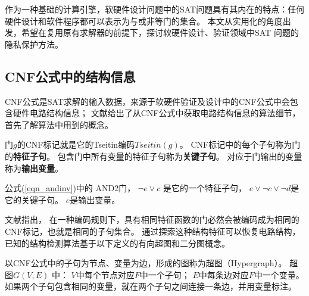 作为一种基础的计算引擎，软硬件设计问题中的SAT问题具有其内在的特点：任何硬件设计和软件程序都可以表示为与或非等门的集合。
本文从实用化的角度出发，希望在复用原有求解器的前提下，探讨软硬件设计、验证领域中SAT 问题的隐私保护方法。

\subsection{CNF公式中的结构信息}\label{CNF structure}
CNF公式是SAT求解的输入数据，来源于软硬件验证及设计中的CNF公式中会包含硬件电路结构信息；
文献给出了从CNF公式中获取电路结构信息的算法细节，首先了解算法中用到的概念。
%
\begin{definition}[CNF标记]
门$g$的CNF标记就是它的Tseitin编码$Tseitin(g)$。
CNF标记中的每个子句称为门的\textbf{特征子句}。
包含门中所有变量的特征子句称为\textbf{关键子句}。
对应于门输出的变量称为\textbf{输出变量}。
\end{definition}

公式(\ref{eqn_andinv})中的 AND2门，
$\neg e\vee c$ 是它的一个特征子句，
$e\vee \neg c\vee\neg d$是它的关键子句。
$e$是输出变量。

文献指出，
在一种编码规则下，具有相同特征函数的门必然会被编码成为相同的CNF标记，也就是相同的子句集合。
通过探索这种结构特征可以恢复电路结构，已知的结构检测算法基于以下定义的有向超图和二分图概念。

\begin{definition}[超图]\label{Hypergraph}
 以CNF公式中的子句为节点、变量为边，形成的图称为超图（Hypergraph）。
 超图$G(V,E)$ 中：
 $V$中每个节点对应$F$中一个子句；
 $E$中每条边对应$F$中一个变量。
 如果两个子句包含相同的变量，就在两个子句之间连接一条边，并用变量标注。
\end{definition}

